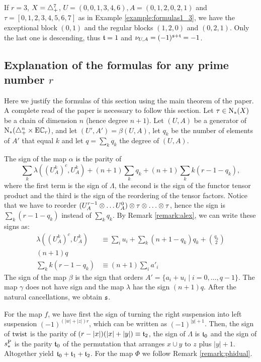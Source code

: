 \begin{example}
	If $r=3$, $X= \triangle_{+}^7$, $U = (0,0,1,3,4,6), A = (0,1,2,0,2,1)$ and $\tau = [0,1,2,3,4,5,6,7]$ as in Example \ref{example:formulas1_3}, we have the exceptional block $(0,1)$ and the regular blocks $(1,2,0)$ and $(0,2,1)$. Only the last one is descending, thus $\mathfrak{t} = 1$ and $\nu_{U,A} = (-1)^{\mathfrak{s}+\mathfrak{t}} = -1$.
\end{example}

\subsection{Explanation of the formulas for any prime number \texorpdfstring{$r$}{r}} Here we justify the formulas of this section using the main theorem of the paper. A complete read of the paper is necessary to follow this section. Let $\tau\in \operatorname{N}_{*}(X)$ be a chain of dimension $n$ (hence degree $n+1$). Let $(U,A)$ be a generator of $\operatorname{N}_{*}(\triangle_{+}^n\times \mathrm{E}\mathbb{C}_r)$, and let $(U',A') = \beta(U,A)$, let $q_k$ be the number of elements of $A'$ that equal $k$ and let $q = \sum_{k}q_k$ the degree of $(U,A)$.

The sign of the map $\alpha$ is the parity of
\[
	\sum_{k}\lambda((U_A^{k})^c,U_A^k) + (n+1)\sum_k q_k + (n+1)\sum_kk(r-1-q_k),
\]
where the first term is the sign of $\Lambda$, the second is the sign of the functor tensor product and the third is the sign of the reordering of the tensor factors. Notice that we have to reorder $(U^{r-1}_A \ot \dots U^0_A) \ot \tau \ot \dots \ot \tau$, hence the sign is $\sum_k(r-1-q_k)$ instead of $\sum_k q_k$. By Remark \ref{remark:alex}, we can write these signs as:
\begin{align}
\label{signo:lambda}	\lambda((U_A^k)^c,U^k_A) &\equiv \sum_i u_i + \sum_k(n+1-q_k)q_k + \binom{q_k}{2}
\\
\label{signo:prod} (n+1)q
\\
 \label{signo:reord} \sum_kk(r-1-q_k)&\equiv (n+1)\sum_{i} a'_i
\end{align}
The sign of the map $\beta$ is the sign that orders $A' = \{a_i+u_i\mid i=0,\dots,q-1\}$. The map $\gamma$ does not have sign and the map $\lambda$ has the sign $(n+1)q$. After the natural cancellations, we obtain $\mathfrak{s}$.

For the map $f$, we have first the sign of turning the right suspension into left suspension $(-1)^{(|w|+|z|)r}$, which can be written as $(-1)^{|y|+1}$. Then, the sign of $\operatorname{twist}$ is the parity of $(r-|x|)(|x|+|y|) \equiv \mathfrak{t}_2$, the sign of $\Lambda$ is $\mathfrak{t}_0$ and the sign of $s_*^{\operatorname{P}}$ is the parity $\mathfrak{t}_0$ of the permutation that arranges $x\cup y$ to $z$ plus $|y|+1$. Altogether yield $\mathfrak{t}_0+\mathfrak{t}_1+\mathfrak{t}_2$. For the map $\Phi$ we follow Remark \ref{remark:phidual}.

